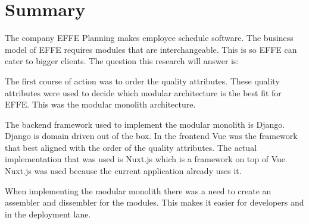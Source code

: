 \chapter{Summary}

The company EFFE Planning makes employee schedule software. The business model of EFFE requires modules that are interchangeable. This is so EFFE can cater to bigger clients.
The question this research will answer is:


The first course of action was to order the quality attributes. These quality attributes were used to decide which modular architecture is the best fit for EFFE. This was the modular monolith architecture.

The backend framework used to implement the modular monolith is Django. Django is domain driven out of the box. In the frontend Vue was the framework that best aligned with the order of the quality attributes. The actual implementation that was used is Nuxt.js which is a framework on top of Vue. Nuxt.js was used because the current application already uses it.

When implementing the modular monolith there was a need to create an assembler and dissembler for the modules. This makes it easier for developers and in the deployment lane.
